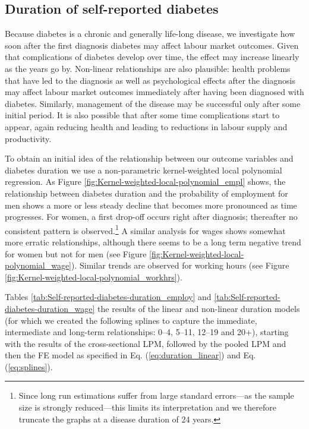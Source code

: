 \subsection{\label{sec:duration}Duration of self-reported  diabetes }

Because diabetes is a chronic and generally life-long disease, we investigate how soon after the first diagnosis diabetes may affect labour market outcomes. Given that complications of diabetes develop over time, the effect may increase linearly as the years go by. Non-linear relationships are also plausible: health problems that have led to the diagnosis as well as psychological effects after the diagnosis may affect labour market outcomes immediately after having been diagnosed with diabetes. Similarly, management of the disease may be successful only after some initial period. It is also possible that after some time complications start to appear, again reducing health and leading to reductions in labour supply and productivity.


To obtain an initial idea of the relationship between our outcome variables and diabetes duration we use a non-parametric kernel-weighted local polynomial regression. As Figure \ref{fig:Kernel-weighted-local-polynomial_empl} shows, the relationship between diabetes duration and the probability of employment for men shows a more or less steady decline that becomes more pronounced as time progresses. For women,
a first drop-off occurs right after diagnosis; thereafter no consistent pattern is observed.\footnote{Since long run estimations suffer from large standard errors---as the sample size is strongly reduced---this limits its interpretation and we therefore truncate the graphs at a disease duration of 24 years.} A similar analysis for wages shows somewhat more erratic relationships, although there seems to be a long term negative trend for women but not for men (see Figure \ref{fig:Kernel-weighted-local-polynomial_wage}).  Similar trends are observed for working hours (see Figure \ref{fig:Kernel-weighted-local-polynomial_workhrs}).

Tables \ref{tab:Self-reported-diabetes-duration_employ} and  \ref{tab:Self-reported-diabetes-duration_wage} \DIFdelbegin {}\DIFdelend \DIFaddbegin {}\DIFaddend the results of the linear and non-linear duration models (for which we created the following splines to capture the immediate, intermediate and long-term relationships: 0--4,
5--11, 12--19 and 20+), starting with the results of the cross-sectional \ac{LPM}, followed by the pooled \ac{LPM} and then the \ac{FE} model as specified in Eq. (\ref{eq:duration_linear}) and Eq. (\ref{eq:splines}).

